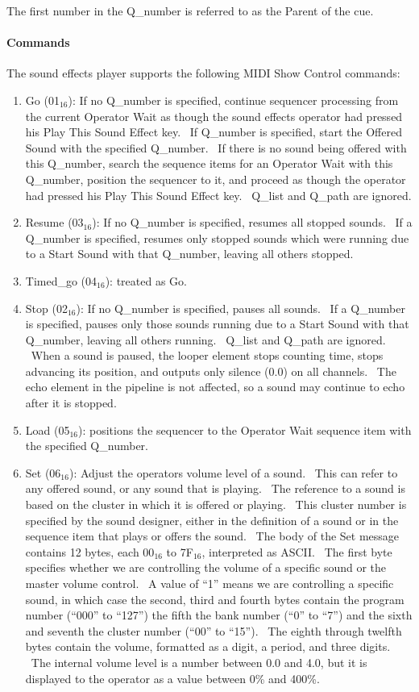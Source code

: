 \documentclass[letterpaper]{article}
\newcommand\textsubscript[1]{\ensuremath{{}_{\text{#1}}}}
\newcommand\liststyleLxvii{%
\renewcommand\theenumi{\arabic{enumi}}
\renewcommand\theenumii{\arabic{enumii}}
\renewcommand\theenumiii{\arabic{enumiii}}
\renewcommand\theenumiv{\arabic{enumiv}}
\renewcommand\labelenumi{\theenumi.}
\renewcommand\labelenumii{\theenumii.}
\renewcommand\labelenumiii{\theenumiii.}
\renewcommand\labelenumiv{\theenumiv.}
}
\begin{document}
The first number in the Q\_number is referred to as the Parent of the
cue.

\paragraph{Commands}
The sound effects player supports the following MIDI Show Control
commands:

\liststyleLxvii
\begin{enumerate}
\item Go (01\textsubscript{16}): If no Q\_number is specified, continue
sequencer processing from the current Operator Wait as though the sound
effects operator had pressed his Play This Sound Effect key. \ If
Q\_number is specified, start the Offered Sound with the specified
Q\_number. \ If there is no sound being offered with this Q\_number,
search the sequence items for an Operator Wait with this Q\_number,
position the sequencer to it, and proceed as though the operator had
pressed his Play This Sound Effect key. \ Q\_list and Q\_path are
ignored.
\item Resume (03\textsubscript{16}): If no Q\_number is specified,
resumes all stopped sounds. \ If a Q\_number is specified, resumes only
stopped sounds which were running due to a Start Sound with that
Q\_number, leaving all others stopped.
\item Timed\_go (04\textsubscript{16}): treated as Go.
\item Stop (02\textsubscript{16}): If no Q\_number is specified, pauses
all sounds. \ If a Q\_number is specified, pauses only those sounds
running due to a Start Sound with that Q\_number, leaving all others
running. \ Q\_list and Q\_path are ignored. \ When a sound is paused,
the looper element stops counting time, stops advancing its position,
and outputs only silence (0.0) on all channels. \ The echo element in
the pipeline is not affected, so a sound may continue to echo after it
is stopped.
\item Load (05\textsubscript{16}): positions the sequencer to the
Operator Wait sequence item with the specified Q\_number.
\item Set (06\textsubscript{16}): Adjust the operator{\textquotesingle}s
volume level of a sound. \ This can refer to any offered sound, or any
sound that is playing. \ The reference to a sound is based on the
cluster in which it is offered or playing. \ This cluster number is
specified by the sound designer, either in the definition of a sound or
in the sequence item that plays or offers the sound. \ The body of the
Set message contains 12 bytes, each 00\textsubscript{16} to
7F\textsubscript{16}, interpreted as ASCII. \ The first byte specifies
whether we are controlling the volume of a specific sound or the master
volume control. \ A value of “1” means we are controlling a specific
sound, in which case the second, third and fourth bytes contain the
program number (“000” to “127”) the fifth the bank number (“0” to “7”)
and the sixth and seventh the cluster number (“00” to “15”). \ The
eighth through twelfth bytes contain the volume, formatted as a digit,
a period, and three digits. \ The internal volume level is a number
between 0.0 and 4.0, but it is displayed to the operator as a value
between 0\% and 400\%.


\end{enumerate}
\end{document}
